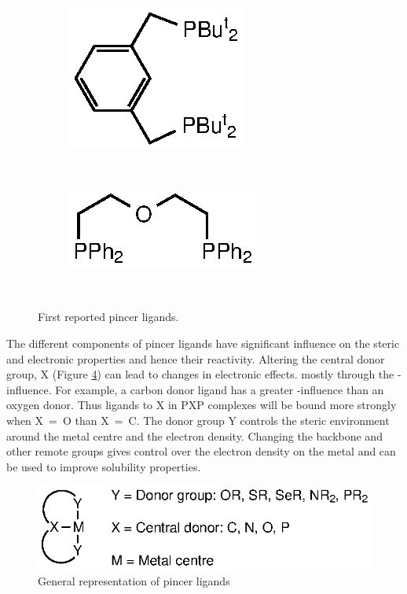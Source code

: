\begin{figure}[htbp]
\centering
\begin{subfigure}[b]{0.3\textwidth}
	\centering
	\includegraphics{../Figures/Shaw.eps}
	\caption{}
	\label{ShawPCP}
\end{subfigure}
~
\begin{subfigure}[b]{0.3\textwidth}
	\centering
	\includegraphics{../Figures/Alcock.eps}
	\caption{}
	\label{AlcockPOP}
\end{subfigure}
\\
\caption[First reported pincer ligands]{First reported pincer ligands.}
\label{Pincerligands}
\end{figure}

The different components of pincer ligands have significant influence on the steric and electronic properties and hence their reactivity.\cite{Singleton2003}  Altering the central donor group, X (Figure \ref{Pincerligands}) can lead to changes in electronic effects. mostly through the \trans{}-influence.\cite{Choi2011}  For example, a carbon donor ligand has a greater \trans{}-influence than an oxygen donor.  Thus ligands \trans{} to X in PXP complexes will be bound more strongly when X~=~O than X~=~C.\cite{Zhu2008} The donor group Y controls the steric environment around the metal centre and the electron density.  Changing the backbone and other remote groups gives control over the electron density on the metal and can be used to improve solubility properties.\cite{Choi2011}

\begin{figure}[htbp]
\centering
\includegraphics{../Figures/Pincerligands.eps}
\caption[General representation of pincer ligands]{General representation of pincer ligands}
\label{Pincerligands}
\end{figure}

